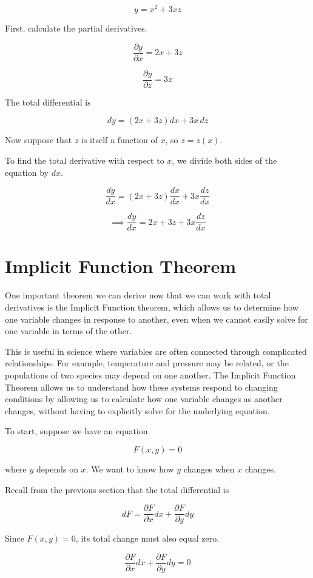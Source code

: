 \documentclass[12pt]{article}
\begin{document}
\[
y=x^2+3xz
\]

First, calculate the partial derivatives.

\[
\frac{\partial y}{\partial x}=2x+3z
\]

\[
\frac{\partial y}{\partial z}=3x
\]

The total differential is

\[
dy=(2x+3z)dx+3x\,dz
\]

Now suppose that $z$ is itself a function
of $x$, so $z=z(x)$.

To find the total derivative with respect to $x$,
we divide both sides of the equation by $dx$.

\[
\frac{dy}{dx}
=
(2x+3z)\frac{dx}{dx}
+
3x\frac{dz}{dx}
\] 

\[
\implies \frac{dy}{dx}
=
2x+3z+3x\frac{dz}{dx}
\]



\section{Implicit Function Theorem}

One important theorem we can derive now that we can work with total derivatives is the Implicit Function theorem, which allows us to determine how one variable changes in response to another, even when we cannot easily solve for one variable in terms of the other. 

This is useful in science where variables are often connected through complicated relationships. For example, temperature and pressure may be related, or the populations of two species may depend on one another. The Implicit Function Theorem allows us to understand how these systems respond to changing conditions by allowing us to calculate how one variable changes as another changes, without having to explicitly solve for the underlying equation.

To start, suppose we have an equation

\[
F(x,y)=0
\]

where $y$ depends on $x$. We want to know how $y$ changes when $x$ changes.

Recall from the previous section that the total
differential is

\[
dF =
\frac{\partial F}{\partial x}dx
+
\frac{\partial F}{\partial y}dy
\]

Since $F(x,y)=0$, its total change must also equal zero.

\[
\frac{\partial F}{\partial x}dx
+
\frac{\partial F}{\partial y}dy
=0
\]
\end{document}
